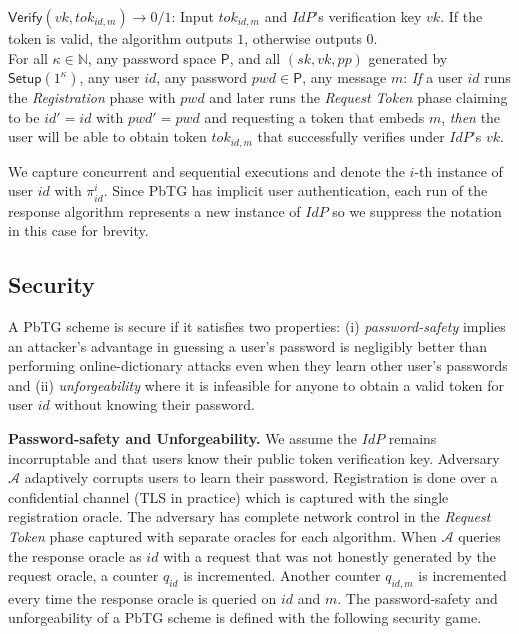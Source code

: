 \documentclass[conference]{IEEEtran}
\newcommand{\cA}{\mathcal{A}}
\newcommand{\secparameter}{\kappa}
\newcommand{\pwd}{pwd}
\newcommand{\sk}{sk}
\newcommand{\vk}{vk}
\newcommand{\pp}{pp}
\newcommand{\uid}{id}
\newcommand{\sP}{\mathsf{P}}
\begin{document}
$\mathsf{Verify}(\vk, tok_{\uid,m}) \rightarrow 0/1$: Input $tok_{\uid,m}$ and $IdP$'s verification key $\vk$. If the token is valid, the algorithm outputs $1$, otherwise outputs $0$.\\
 For all $\secparameter \in \mathbb{N}$, any password space $\mathsf{P}$, and all $(\sk, \vk, \pp)$ generated by $\mathsf{Setup}(1^{\secparameter})$, any user $\uid$, any password $\pwd \in \sP$, any message $m$: {\em If} a user $id$ runs the {\em Registration} phase with $pwd$ and later runs the {\em Request Token} phase claiming to be $id'=id$ with $pwd'=pwd$ and requesting a token that embeds $m$, {\em then} the user will be able to obtain token $tok_{id,m}$ that successfully verifies under $IdP$'s $\vk$.  

We capture concurrent and sequential executions and denote the $i$-th instance of user $\uid$ with $\pi^{i}_{\uid}$. Since PbTG has implicit user authentication, each run of the response algorithm represents a new instance of $IdP$ so we suppress the notation in this case for brevity.

\subsection{Security} 
A PbTG scheme is secure if it satisfies two properties: (i) \emph{password-safety} implies an attacker's advantage in guessing a user's password is negligibly better than performing online-dictionary attacks even when they learn other user's passwords and (ii) \emph{unforgeability} where it is infeasible for anyone to obtain a valid token for user $\uid$ without knowing their password. 


\vspace{1mm}
\noindent
{\bf Password-safety and Unforgeability.}
We assume the $IdP$ remains incorruptable and that users know their public token verification key. Adversary $\cA$ adaptively corrupts users to learn their password. Registration is done over a confidential channel (TLS in practice) which is captured with the single registration oracle. The adversary has complete network control in the {\em Request Token} phase captured with separate oracles for each algorithm. When $\cA$ queries the response oracle as $\uid$ with a request that was not honestly generated by the request oracle, a counter $q_{\uid}$ is incremented. Another counter $q_{\uid,m}$ is incremented every time the response oracle is queried on $\uid$ and $m$.
The password-safety and unforgeability of a PbTG scheme is defined with the following security game.
\end{document}

